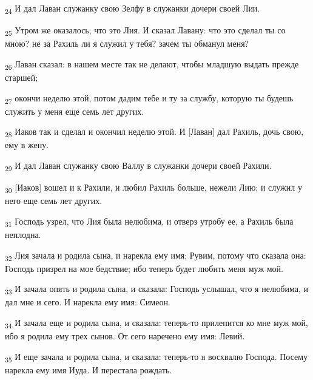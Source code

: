 \begin{tcolorbox}
\textsubscript{24} И дал Лаван служанку свою Зелфу в служанки дочери своей Лии.
\end{tcolorbox}
\begin{tcolorbox}
\textsubscript{25} Утром же оказалось, что это Лия. И сказал Лавану: что это сделал ты со мною? не за Рахиль ли я служил у тебя? зачем ты обманул меня?
\end{tcolorbox}
\begin{tcolorbox}
\textsubscript{26} Лаван сказал: в нашем месте так не делают, чтобы младшую выдать прежде старшей;
\end{tcolorbox}
\begin{tcolorbox}
\textsubscript{27} окончи неделю этой, потом дадим тебе и ту за службу, которую ты будешь служить у меня еще семь лет других.
\end{tcolorbox}
\begin{tcolorbox}
\textsubscript{28} Иаков так и сделал и окончил неделю этой. И [Лаван] дал Рахиль, дочь свою, ему в жену.
\end{tcolorbox}
\begin{tcolorbox}
\textsubscript{29} И дал Лаван служанку свою Валлу в служанки дочери своей Рахили.
\end{tcolorbox}
\begin{tcolorbox}
\textsubscript{30} [Иаков] вошел и к Рахили, и любил Рахиль больше, нежели Лию; и служил у него еще семь лет других.
\end{tcolorbox}
\begin{tcolorbox}
\textsubscript{31} Господь узрел, что Лия была нелюбима, и отверз утробу ее, а Рахиль была неплодна.
\end{tcolorbox}
\begin{tcolorbox}
\textsubscript{32} Лия зачала и родила сына, и нарекла ему имя: Рувим, потому что сказала она: Господь призрел на мое бедствие; ибо теперь будет любить меня муж мой.
\end{tcolorbox}
\begin{tcolorbox}
\textsubscript{33} И зачала опять и родила сына, и сказала: Господь услышал, что я нелюбима, и дал мне и сего. И нарекла ему имя: Симеон.
\end{tcolorbox}
\begin{tcolorbox}
\textsubscript{34} И зачала еще и родила сына, и сказала: теперь-то прилепится ко мне муж мой, ибо я родила ему трех сынов. От сего наречено ему имя: Левий.
\end{tcolorbox}
\begin{tcolorbox}
\textsubscript{35} И еще зачала и родила сына, и сказала: теперь-то я восхвалю Господа. Посему нарекла ему имя Иуда. И перестала рождать.
\end{tcolorbox}
